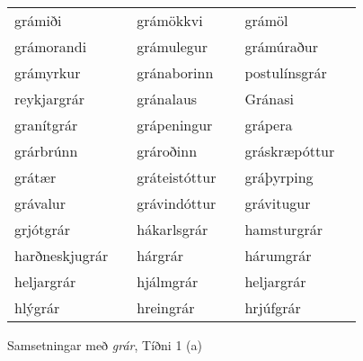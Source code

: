 \documentclass[../samsetningasafn.tex]{subfiles}
\begin{document}
\begin{wordlist}[H]
\begin{tcolorbox}
\begin{tabular}{BlBlBl}
		grámiði			&		& 
		grámökkvi		&		& 
		grámöl			&		\\  %
		grámorandi		&		& 
		grámulegur		&		& 
		grámúraður		&		\\  %
		grámyrkur		&		& 
		gránaborinn		&		& 
		postulínsgrár	&		\\  %
		reykjargrár		&		& 
		gránalaus		&		& 
		Gránasi			&		\\  %
		granítgrár		&		& 
		grápeningur		&		& 
		grápera			&		\\  %
		grárbrúnn		&		& 
		grároðinn		&		& 
		gráskræpóttur	&		\\  %
		grátær			&		& 
		gráteistóttur		&		& 
		gráþyrping		&		\\  %
		grávalur			&		& 
		grávindóttur		&		& 
		grávitugur		&		\\  %
		grjótgrár		&		& 
		hákarlsgrár		&		& 
		hamsturgrár		&		\\  %
		harðneskjugrár	&		& 
		hárgrár			&		& 
		hárumgrár		&		\\  %
		heljargrár		&		& 
		hjálmgrár		&		& 
		heljargrár		&		\\  %
		hlýgrár			&		& 
		hreingrár		&		& 
		hrjúfgrár		&			 %
	\end{tabular}

\end{tcolorbox}
	\caption{Samsetningar með \textit{grár}, Tíðni 1 (a)}
	\label{listi:gratt.1a}
\end{wordlist}		
		
\end{document}
